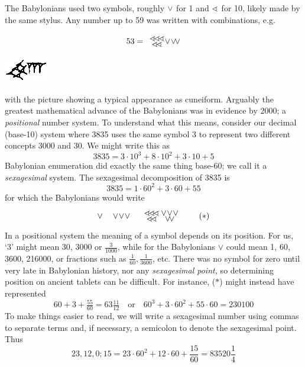The Babylonians used two symbols, roughly $\vee$ for 1 and $\sphericalangle$ for 10, likely made by the same stylus. Any number up to 59 was written with combinations, e.g.\par
\begin{minipage}[t]{0.8\linewidth}\vspace{-10pt}
	\[
		53=
		\begin{array}{c}
			\bten\!\bten\!\bten\\[-5pt]
			\bten\!\bten
		\end{array}
		\hspace{-7pt}
		\bone\!\bone\!\bone
	\]
\end{minipage}
\hfill
\begin{minipage}[t]{0.19\linewidth}\vspace{0pt}
	\flushright
	\includegraphics{babylon53}
\end{minipage}
\medbreak
with the picture showing a typical appearance as cuneiform. Arguably the greatest mathematical advance of the Babylonians was in evidence by 2000\BC{}; a \emph{positional} number system. To understand what this means, consider our decimal (base-10) system where 3835 uses the same symbol 3 to represent two different concepts 3000 and 30. We might write this as
\[
	3835=3\cdot 10^3+8\cdot 10^2+3\cdot 10+5
\]
Babylonian enumeration did exactly the same thing base-60; we call it a \emph{sexagesimal} system. The sexagesimal decomposition of 3835 is
\[
	3835=1\cdot 60^2+3\cdot 60+55
\]
for which the Babylonians would write
\[
	\vee\quad \vee\!\vee\!\vee\quad 
	\begin{array}{c}
		\bten\!\bten\!\bten\\[-5pt]
		\bten\!\bten
	\end{array}
	\hspace{-8pt}
	\begin{array}{c}
		\bone\!\bone\!\bone\\[-5pt]
		\bone\!\bone
	\end{array}
	\tag{$\ast$}
\]
In a positional system the meaning of a symbol depends on its position. For us, `3' might mean 30, 3000 or $\frac 3{1000}$, while for the Babylonians $\vee$ could mean 1, 60, 3600, 216000, or fractions such as $\frac 1{60},\frac 1{3600}$, etc. There was no symbol for zero until very late in Babylonian history, nor any \emph{sexagesimal point,} so determining position on ancient tablets can be difficult. For instance, ($\ast$) might instead have represented
\[
	60+3+\tfrac{55}{60}=63\tfrac{11}{12}\quad\text{or}\quad 60^3+3\cdot 60^2+55\cdot 60=230100
\]
To make things easier to read, we will write a sexagesimal number using commas to separate terms and, if necessary, a semicolon to denote the sexagesimal point. Thus
\[
	23,12,0;15=23\cdot 60^2+12\cdot 60+\frac{15}{60}=83520\frac 14
\] 

